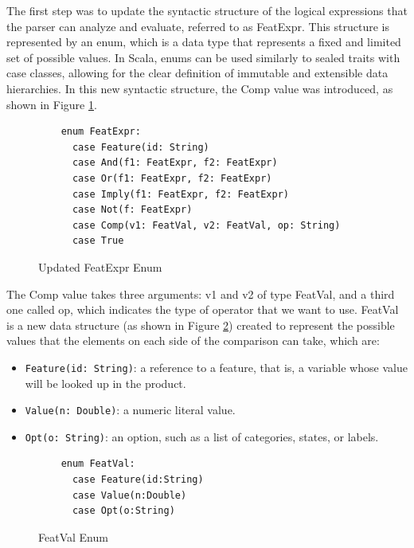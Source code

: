 The first step was to update the syntactic structure of the logical expressions that the parser can analyze and evaluate, referred to as FeatExpr. This structure is represented by an enum, which is a data type that represents a fixed and limited set of possible values. In Scala, enums can be used similarly to sealed traits with case classes, allowing for the clear definition of immutable and extensible data hierarchies. In this new syntactic structure, the Comp value was introduced, as shown in Figure \ref{fig:FeatExpr}.


\begin{figure}[H]
\centering
\begin{minipage}{0.9\linewidth}
\begin{verbatim}
    enum FeatExpr:
      case Feature(id: String)
      case And(f1: FeatExpr, f2: FeatExpr)
      case Or(f1: FeatExpr, f2: FeatExpr)
      case Imply(f1: FeatExpr, f2: FeatExpr)
      case Not(f: FeatExpr)
      case Comp(v1: FeatVal, v2: FeatVal, op: String)
      case True
\end{verbatim}
\end{minipage}
\caption{Updated FeatExpr Enum}
\label{fig:FeatExpr}
\end{figure}

The Comp value takes three arguments: v1 and v2 of type FeatVal, and a third one called op, which indicates the type of operator that we want to use. FeatVal is a new data structure (as shown in Figure \ref{fig:FeatVal}) created to represent the possible values that the elements on each side of the comparison can take, which are:

\begin{itemize}
  \item \texttt{Feature(id: String)}: a reference to a feature, that is, a variable whose value will be looked up in the product.
  \item \texttt{Value(n: Double)}: a numeric literal value.
  \item \texttt{Opt(o: String)}: an option, such as a list of categories, states, or labels.
\end{itemize}

\begin{figure}[H]
\centering
\begin{minipage}{0.9\linewidth}
\begin{verbatim}
    enum FeatVal:
      case Feature(id:String)
      case Value(n:Double)
      case Opt(o:String)
\end{verbatim}
\end{minipage}
\caption{FeatVal Enum}
\label{fig:FeatVal}
\end{figure}

